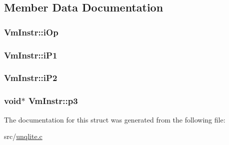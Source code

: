 \subsection{Member Data Documentation}
\hypertarget{struct_vm_instr_a07b706beee4bd8af1d91b015febc7dde}{
\subsubsection[{i\-Op}]{ Vm\-Instr\-::i\-Op}}\label{d1/dc1/struct_vm_instr_a07b706beee4bd8af1d91b015febc7dde}
\hypertarget{struct_vm_instr_a77c85ac2f3eed950457e7394560027ca}{
\subsubsection[{i\-P1}]{ Vm\-Instr\-::i\-P1}}\label{d1/dc1/struct_vm_instr_a77c85ac2f3eed950457e7394560027ca}
\hypertarget{struct_vm_instr_a6439f55a465ca1744a5c3176d81ff2fe}{
\subsubsection[{i\-P2}]{ Vm\-Instr\-::i\-P2}}\label{d1/dc1/struct_vm_instr_a6439f55a465ca1744a5c3176d81ff2fe}
\hypertarget{struct_vm_instr_aac547d9de597b591c9b3e97b4bd8fa4d}{
\subsubsection[{p3}]{\setlength{\rightskip}{0pt plus 5cm}void$\ast$ Vm\-Instr\-::p3}}\label{d1/dc1/struct_vm_instr_aac547d9de597b591c9b3e97b4bd8fa4d}


The documentation for this struct was generated from the following file\-:\begin{DoxyCompactItemize}
\item 
src/\hyperlink{unqlite_8c}{unqlite.\-c}\end{DoxyCompactItemize}
